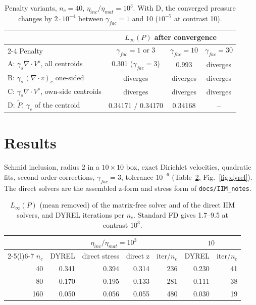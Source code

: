 \documentclass[11pt,a4paper]{article}
\newcommand{\code}[1]{\texttt{#1}}
\begin{document}
\begin{table}[h]
\centering
\small
\begin{tabular}{@{}l ccc@{}}
\toprule
& \multicolumn{3}{c}{$L_\infty(P)$ after convergence}\\
\cmidrule(l){2-4}
Penalty & $\gamma_{fac}=1$ or 3 & $\gamma_{fac}=10$ & $\gamma_{fac}=30$\\
\midrule
A: $\gamma_s\nabla\cdot V^s$, all centroids    & 0.301 ($\gamma_{fac}=3$) & 0.993 & diverges\\
B: $\gamma_s\,(\nabla\cdot v)_c$ one-sided       & diverges & diverges & diverges\\
C: $\gamma_s\nabla\cdot V^s$, own-side centroids & diverges & diverges & diverges\\
D: $\tilde P$, $\gamma_c$ of the centroid        & 0.34171 / 0.34170 & 0.34168 & --\\
\bottomrule
\end{tabular}
\caption{Penalty variants, $n_c=40$, $\eta_{inc}/\eta_{mat}=10^3$. With D, the converged pressure
changes by $2\cdot10^{-4}$ between $\gamma_{fac}=1$ and 10 ($10^{-7}$ at contrast 10).}
\label{tab:penalty}
\end{table}

\section{Results}

Schmid inclusion, radius 2 in a $10\times10$ box, exact Dirichlet velocities, quadratic fits,
second-order corrections, $\gamma_{fac}=3$, tolerance $10^{-6}$ (Table~\ref{tab:results},
Fig.~\ref{fig:dyrel}). The direct solvers are the assembled z-form and stress form of
\code{docs/IIM\_notes}.

\begin{table}[h]
\centering
\small
\begin{tabular}{@{}r rrrr rr@{}}
\toprule
& \multicolumn{4}{c}{$\eta_{inc}/\eta_{mat}=10^3$} & \multicolumn{2}{c}{$10$}\\
\cmidrule(lr){2-5}\cmidrule(l){6-7}
$n_c$ & DYREL & direct stress & direct z & iter/$n_c$ & DYREL & iter/$n_c$\\
\midrule
 40 & 0.341 & 0.394 & 0.314 & 236 & 0.230 & 41\\
 80 & 0.170 & 0.195 & 0.133 & 281 & 0.111 & 38\\
160 & 0.050 & 0.056 & 0.055 & 480 & 0.030 & 19\\
\bottomrule
\end{tabular}
\caption{$L_\infty(P)$ (mean removed) of the matrix-free solver and of the direct IIM solvers,
and DYREL iterations per $n_c$. Standard FD gives 1.7--9.5 at contrast $10^3$.}
\label{tab:results}
\end{table}
\end{document}
